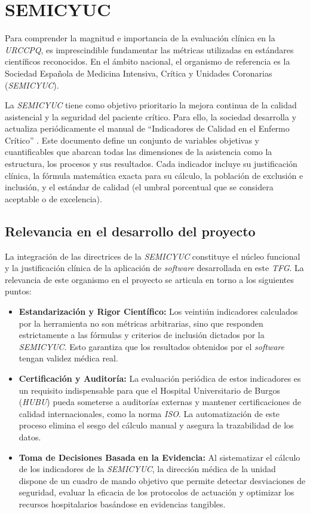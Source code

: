 
\section{SEMICYUC}
Para comprender la magnitud e importancia de la evaluación clínica en la \textit{URCCPQ}, es imprescindible fundamentar las métricas utilizadas en estándares científicos reconocidos. En el ámbito nacional, el organismo de referencia es la Sociedad Española de Medicina Intensiva, Crítica y Unidades Coronarias (\textit{SEMICYUC}). 

La \textit{SEMICYUC} tiene como objetivo prioritario la mejora continua de la calidad asistencial y la seguridad del paciente crítico. Para ello, la sociedad desarrolla y actualiza periódicamente el manual de ``Indicadores de Calidad en el Enfermo Crítico'' \cite{semicyuc}. Este documento define un conjunto de variables objetivas y cuantificables que abarcan todas las dimensiones de la asistencia como la estructura, los procesos y sus resultados. Cada indicador incluye su justificación clínica, la fórmula matemática exacta para su cálculo, la población de exclusión e inclusión, y el estándar de calidad (el umbral porcentual que se considera aceptable o de excelencia).

\subsection{Relevancia en el desarrollo del proyecto}
La integración de las directrices de la \textit{SEMICYUC} constituye el núcleo funcional y la justificación clínica de la aplicación de \textit{software} desarrollada en este \textit{TFG}. La relevancia de este organismo en el proyecto se articula en torno a los siguientes puntos:

\begin{itemize}
    \item \textbf{Estandarización y Rigor Científico:} Los veintiún indicadores calculados por la herramienta no son métricas arbitrarias, sino que responden estrictamente a las fórmulas y criterios de inclusión dictados por la \textit{SEMICYUC}. Esto garantiza que los resultados obtenidos por el \textit{software} tengan validez médica real.
    \item \textbf{Certificación y Auditoría:} La evaluación periódica de estos indicadores es un requisito indispensable para que el Hospital Universitario de Burgos (\textit{HUBU}) pueda someterse a auditorías externas y mantener certificaciones de calidad internacionales, como la norma \textit{ISO}. La automatización de este proceso elimina el sesgo del cálculo manual y asegura la trazabilidad de los datos.
    \item \textbf{Toma de Decisiones Basada en la Evidencia:} Al sistematizar el cálculo de los indicadores de la \textit{SEMICYUC}, la dirección médica de la unidad dispone de un cuadro de mando objetivo que permite detectar desviaciones de seguridad, evaluar la eficacia de los protocolos de actuación y optimizar los recursos hospitalarios basándose en evidencias tangibles.
\end{itemize}

